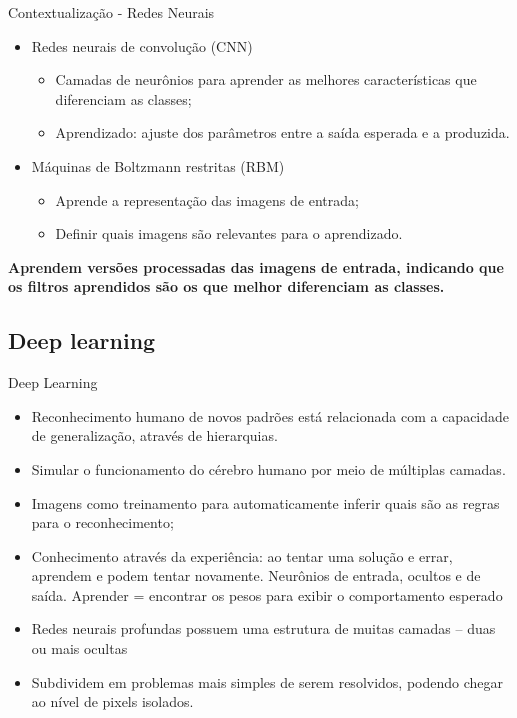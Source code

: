 \documentclass{beamer}
\begin{document}
\begin{frame}{Contextualização - Redes Neurais}
\justifying
  \begin{itemize}
    \item Redes neurais de convolução (CNN)
    \begin{itemize}
        \item Camadas de neurônios para aprender as melhores características que diferenciam as classes;
        \item Aprendizado: ajuste dos parâmetros entre a saída esperada e a produzida.
    \end{itemize}
    \item Máquinas de Boltzmann restritas (RBM)
    \begin{itemize}
        \item Aprende a representação das imagens de entrada;
        \item Definir quais imagens são relevantes para o aprendizado.
    \end{itemize}
  \end{itemize}
 \textbf{Aprendem versões processadas das imagens de entrada, indicando que os filtros aprendidos são os que melhor diferenciam as classes.}
\end{frame}
\subsection{Deep learning}
\begin{frame}{Deep Learning}
\begin{itemize}
  \item Reconhecimento humano de novos padrões está relacionada com a capacidade de generalização, através de hierarquias.%
  \item Simular o funcionamento do cérebro humano por meio de múltiplas camadas.
  \item Imagens como treinamento para automaticamente inferir quais são as regras para o reconhecimento;
  \item Conhecimento através da experiência: ao tentar uma solução e errar, aprendem e podem tentar novamente. Neurônios de entrada, ocultos e de saída. Aprender = encontrar os pesos para exibir o comportamento esperado%
  \item Redes neurais profundas possuem uma estrutura de muitas camadas -- duas ou mais ocultas %
  \item Subdividem em problemas mais simples de serem resolvidos, podendo chegar ao nível de pixels isolados.
\end{itemize}


\end{frame}
\end{document}
